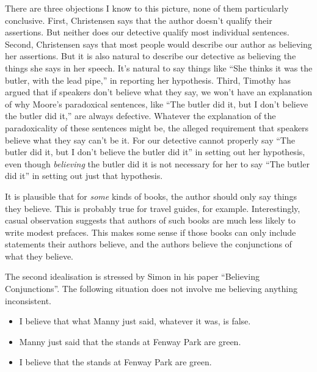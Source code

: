 There are three objections I know to this picture, none of them particularly conclusive. First, Christensen says that the author doesn't qualify their assertions. But neither does our detective qualify most individual sentences. Second, Christensen says that most people would describe our author as believing her assertions. But it is also natural to describe our detective as believing the things she says in her speech. It's natural to say things like ``She thinks it was the butler, with the lead pipe,'' in reporting her hypothesis. Third, Timothy \citet{Williamson2000-WILKAI} has argued that if speakers don't believe what they say, we won't have an explanation of why Moore's paradoxical sentences, like ``The butler did it, but I don't believe the butler did it,'' are always defective. Whatever the explanation of the paradoxicality of these sentences might be, the alleged requirement that speakers believe what they say can't be it. For our detective cannot properly say ``The butler did it, but I don't believe the butler did it'' in setting out her hypothesis, even though \textit{believing} the butler did it is not necessary for her to say ``The butler did it'' in setting out just that hypothesis.

It is plausible that for \textit{some} kinds of books, the author should only say things they believe. This is probably true for travel guides, for example. Interestingly, casual observation suggests that authors of such books are much less likely to write modest prefaces. This makes some sense if those books can only include statements their authors believe, and the authors believe the conjunctions of what they believe.

The second idealisation is stressed by Simon \citeauthor{Evnine1999} in his paper ``Believing Conjunctions''. The following situation does not involve me believing anything inconsistent. 

\begin{itemize}
\item I believe that what Manny just said, whatever it was, is false. 
\item Manny just said that the stands at Fenway Park are green. 
\item I believe that the stands at Fenway Park are green. 
\end{itemize}

